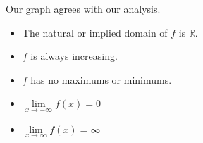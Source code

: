 \documentclass{ximera}
\begin{document}
\begin{example}
\begin{explanation}
Our graph agrees with our analysis.

\begin{itemize}
\item The natural or implied domain of $f$ is $\mathbb{R}$.
\item $f$ is always increasing.
\item $f$ has no maximums or minimums.
\item $\lim\limits_{x \to -\infty} f(x) = 0$
\item $\lim\limits_{x \to \infty} f(x) = \infty$
\end{itemize}




\end{explanation}

\end{example}
\end{document}
